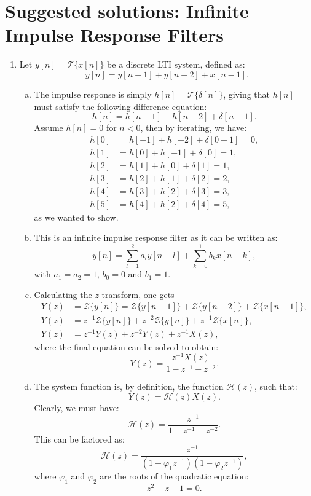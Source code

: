\newpage
\section{Suggested solutions: Infinite Impulse Response Filters}

\begin{enumerate}
\item Let $y[n]=\mathcal{T}\{x[n]\}$ be a discrete LTI system, defined as:
$$y[n]=y[n-1]+y[n-2]+x[n-1].$$

\begin{enumerate}[a)]
\item The impulse response is simply $h[n]=\mathcal{T}\{\delta[n]\}$, giving that $h[n]$ must satisfy the following difference equation:
$$h[n]=h[n-1]+h[n-2]+\delta[n-1].$$
Assume $h[n]=0$ for $n<0$, then by iterating, we have:
\begin{align*}
    h[0]&= h[-1] + h[-2] + \delta[0-1]=0, \\
    h[1]&= h[0]  + h[-1] + \delta[0]=1, \\
    h[2]&= h[1]  + h[0]  + \delta[1]=1, \\
    h[3]&= h[2]  + h[1]  + \delta[2]=2, \\
    h[4]&= h[3]  + h[2]  + \delta[3]=3, \\
    h[5]&= h[4]  + h[2]  + \delta[4]=5, 
\end{align*}
as we wanted to show.

\item This is an infinite impulse response filter as it can be written as:
$$y[n]=\sum_{l=1}^{2} a_{l}y[n-l]+\sum_{k=0}^{1} b_{k}x[n-k],$$
with $a_{1}=a_{2}=1$, $b_{0}=0$ and $b_{1}=1$. 

\item Calculating the $z$-transform, one gets
\begin{align*}
    Y(z)&=\mathcal{Z}\{y[n]\}=\mathcal{Z}\{y[n-1]\}+\mathcal{Z}\{y[n-2]\}+\mathcal{Z}\{x[n-1]\}, \\
    Y(z)&=z^{-1}\mathcal{Z}\{y[n]\} + z^{-2}\mathcal{Z}\{y[n]\} + z^{-1}\mathcal{Z}\{x[n]\}, \\
    Y(z)&=z^{-1}Y(z) + z^{-2}Y(z) + z^{-1}X(z),
\end{align*}
where the final equation can be solved to obtain:
$$Y(z)=\frac{z^{-1}X(z)}{1-z^{-1}-z^{-2}}.$$

\item The system function is, by definition, the function $\mathcal{H}(z)$, such that:
$$Y(z)=\mathcal{H}(z)X(z).$$
Clearly, we must have:
$$\mathcal{H}(z)=\frac{z^{-1}}{1-z^{-1}-z^{-2}}.$$
This can be factored as:
$$\mathcal{H}(z)=\frac{z^{-1}}{(1-\varphi_{1}z^{-1})(1-\varphi_{2}z^{-1})},$$
where $\varphi_{1}$ and $\varphi_{2}$ are the roots of the quadratic equation:
$$z^{2}-z-1=0.$$


\end{enumerate}
\end{enumerate}
